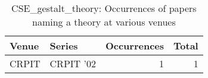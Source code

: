 \begin{table*}[t]
\begin{tabular}{llrr}
Venue & Series & Occurrences & Total\\\hline
\multirow{1}{*}{CRPIT } & CRPIT '02 & 1 & \multirow{1}{*}{1}\\
\end{tabular}
\caption{CSE\_gestalt\_theory: Occurrences of papers naming a theory at various venues}
\end{table*}
